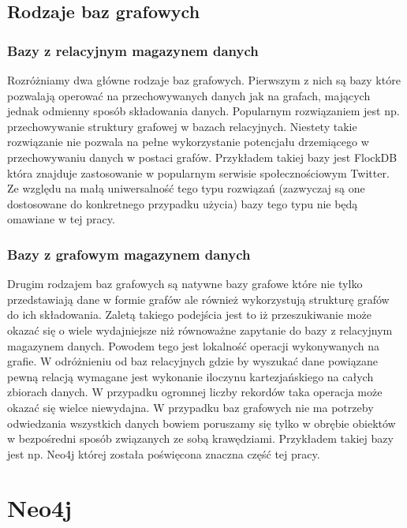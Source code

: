 \documentclass[brudnopis]{xmgr}
\begin{document}
\section{Rodzaje baz grafowych}

\subsection{Bazy z relacyjnym magazynem danych}

Rozróżniamy dwa główne rodzaje baz grafowych. Pierwszym z nich są bazy które pozwalają operować na przechowywanych danych jak na grafach, mających jednak odmienny sposób składowania danych. Popularnym rozwiązaniem jest np. przechowywanie struktury grafowej w bazach relacyjnych. Niestety takie rozwiązanie nie pozwala na pełne wykorzystanie potencjału drzemiącego w przechowywaniu danych w postaci grafów. Przykładem takiej bazy jest FlockDB\cite{flockdb} która znajduje zastosowanie w popularnym serwisie społecznościowym Twitter. Ze względu na małą uniwersalność tego typu rozwiązań (zazwyczaj są one dostosowane do konkretnego przypadku użycia) bazy tego typu nie będą omawiane w tej pracy.

\subsection{Bazy z grafowym magazynem danych}
Drugim rodzajem baz grafowych są natywne bazy grafowe które nie tylko przedstawiają dane w formie grafów ale również wykorzystują strukturę grafów do ich składowania. Zaletą takiego podejścia jest to iż przeszukiwanie może okazać się o wiele wydajniejsze niż równoważne zapytanie do bazy z relacyjnym magazynem danych. Powodem tego jest lokalność operacji wykonywanych na grafie. W odróżnieniu od baz relacyjnych gdzie by wyszukać dane powiązane pewną relacją wymagane jest wykonanie iloczynu kartezjańskiego na całych zbiorach danych. W przypadku ogromnej liczby rekordów taka operacja może okazać się wielce niewydajna. W przypadku baz grafowych nie ma potrzeby odwiedzania wszystkich danych bowiem poruszamy się tylko w obrębie obiektów w bezpośredni sposób związanych ze sobą krawędziami. Przykładem takiej bazy jest np. Neo4j której została poświęcona znaczna część tej pracy.

\chapter{Neo4j}
\end{document}

